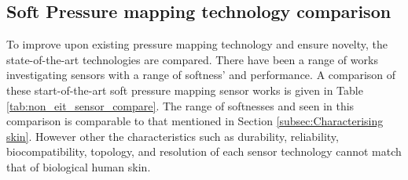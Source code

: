 \subsection{Soft Pressure mapping technology comparison}
To improve upon existing pressure mapping technology and ensure novelty, the state-of-the-art technologies are compared. There have been a range of works investigating sensors with a range of softness' and performance. A comparison of these start-of-the-art soft pressure mapping sensor works is given in Table \ref{tab:non_eit_sensor_compare}.  The range of softnesses and seen in this comparison is comparable to that mentioned in Section \ref{subsec:Characterising skin}. However other the characteristics such as durability, reliability, biocompatibility, topology, and resolution of each sensor technology cannot match that of biological human skin.
